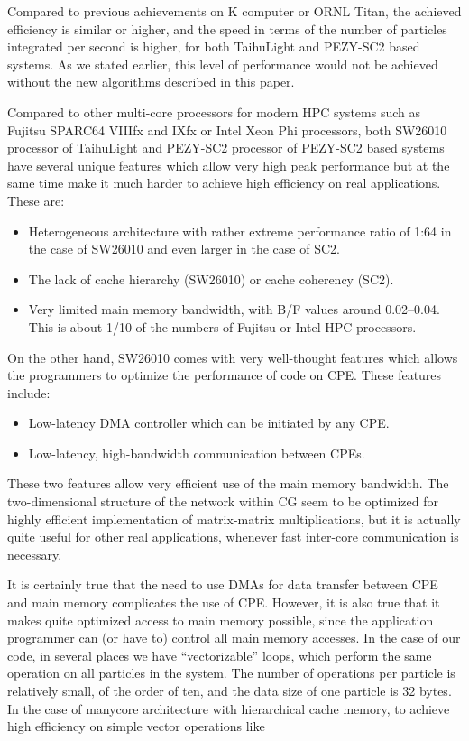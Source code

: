 \documentclass[conference]{IEEEtran}
\begin{document}
Compared to previous achievements on K computer or ORNL Titan, the
achieved efficiency is similar or higher, and the speed in terms of
the number of particles integrated per second is higher, for both
TaihuLight and PEZY-SC2 based systems. As we stated earlier, this level of
performance would not be achieved without the new algorithms described in
this paper. 

Compared to other multi-core processors for modern  HPC systems such
as Fujitsu SPARC64 VIIIfx and IXfx or Intel Xeon Phi processors,
both SW26010 processor  of TaihuLight and PEZY-SC2 processor of
PEZY-SC2 based systems have several unique features which allow very high peak
performance but at the same time make it much harder to achieve high
efficiency on real applications. These are:

\begin{itemize}

  \item Heterogeneous architecture with rather extreme performance
    ratio of 1:64 in the case of SW26010 and even larger in the case
    of SC2.
  \item The lack of cache hierarchy (SW26010) or cache coherency (SC2).
  \item Very limited main memory bandwidth, with B/F values around
    0.02--0.04.  This is about 1/10 of the numbers of Fujitsu or Intel HPC processors.
    
\end{itemize}  

On the other hand, SW26010 comes with very well-thought features which
allows the programmers to optimize the performance of code on
CPE. These features include:
\begin{itemize}

\item Low-latency DMA controller which can be initiated by any CPE.
\item Low-latency, high-bandwidth communication between CPEs.
  
\end{itemize}  

These two features allow very efficient use of the main memory
bandwidth. The two-dimensional structure of the network within CG seem
to be optimized for highly efficient implementation of matrix-matrix
multiplications, but it is actually quite useful for other real
applications, whenever fast inter-core communication is necessary.

It is certainly true that the need to use DMAs for data transfer
between CPE and main memory complicates the use of CPE. However, it is
also true that it makes quite optimized access to main memory
possible, since the application programmer can (or have to) control
all main memory accesses. In the case of our code, in several places
we have ``vectorizable'' loops, which perform the same operation on all
particles in the system. The number of operations per particle is
relatively small, of the order of ten, and the data size of one
particle is 32 bytes. In the case of manycore architecture with
hierarchical cache memory, to achieve high efficiency on simple vector
operations like 
\end{document}
